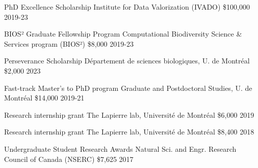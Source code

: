 



\begin{cvhonors}

  \cvhonor
    {PhD Excellence Scholarship} %
    {Institute for Data Valorization (IVADO)} %
    {\$100,000} %
    {2019-23} %

  \cvhonor
    {BIOS² Graduate Fellowship Program} %
    {Computational Biodiversity Science \& Services program (BIOS²)} %
    {\$8,000} %
    {2019-23} %

  \cvhonor
    {Perseverance Scholarship} %
    {Département de sciences biologiques, U. de Montréal} %
    {\$2,000} %
    {2023} %

  \cvhonor
    {Fast-track Master's to PhD program} %
    {Graduate and Postdoctoral Studies, U. de Montréal} %
    {\$14,000} %
    {2019-21} %

  \cvhonor
    {Research internship grant} %
    {The Lapierre lab, Université de Montréal} %
    {\$6,000} %
    {2019} %
    
  \cvhonor
    {Research internship grant} %
    {The Lapierre lab, Université de Montréal} %
    {\$8,400} %
    {2018} %

  \cvhonor
    {Undergraduate Student Research Awards} %
    {Natural Sci. and Engr. Research Council of Canada (NSERC)} %
    {\$7,625} %
    {2017} %
    

\end{cvhonors}


